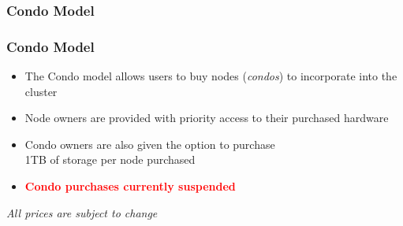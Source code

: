 \subsubsection{Condo Model}
\begin{frame}
	\frametitle{Condo Model}
	\begin{itemize}
		\item The Condo model allows users to buy nodes (\emph{condos}) to incorporate into the cluster	
		\item Node owners are provided with priority access to their purchased hardware
		\item Condo owners are also given the option to purchase~\\1TB of {\lustre} storage per node purchased
                \item {\textcolor{red}{\textbf{ Condo purchases currently suspended} }}
	\end{itemize}
        \btVFill
        \begin{center}{\footnotesize \emph{All prices are subject to change}}\end{center}
\end{frame}


